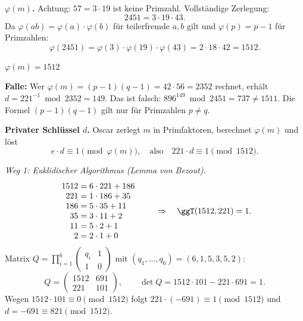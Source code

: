  \textbf{$\varphi(m)$.} Achtung: $57 = 3 \cdot 19$ ist keine Primzahl. Vollständige Zerlegung:
\[
2451 = 3 \cdot 19 \cdot 43 .
\]
Da $\varphi(ab) = \varphi(a) \cdot \varphi(b)$ für teilerfremde $a, b$ gilt und $\varphi(p) = p - 1$ für Primzahlen:
\[
\varphi(2451) = \varphi(3) \cdot \varphi(19) \cdot \varphi(43) = 2 \cdot 18 \cdot 42 = 1512 .
\]
\begin{ergebnis} $\varphi(m) = 1512$ \end{ergebnis}
\begin{achtung}
\textbf{Falle:} Wer $\varphi(m) = (p-1)(q-1) = 42 \cdot 56 = 2352$ rechnet, erhält $d = 221^{-1} \bmod 2352 = 149$.
Das ist falsch: $896^{149} \bmod 2451 = 737 \neq 1511$. Die Formel $(p-1)(q-1)$ gilt nur für Primzahlen $p \neq q$.
\end{achtung}

 \textbf{Privater Schlüssel $d$.}
Oscar zerlegt $m$ in Primfaktoren, berechnet $\varphi(m)$ und löst
\[
e \cdot d \equiv 1 \pmod{\varphi(m)}, \quad\text{also}\quad 221 \cdot d \equiv 1 \pmod{1512}.
\]

\emph{Weg 1: Euklidischer Algorithmus (Lemma von Bezout).}
\[
\begin{array}{r@{\;=\;}l}
1512 & 6 \cdot 221 + 186\\
221 & 1 \cdot 186 + 35\\
186 & 5 \cdot 35 + 11\\
35 & 3 \cdot 11 + 2\\
11 & 5 \cdot 2 + 1\\
2 & 2 \cdot 1 + 0
\end{array}
\qquad\Rightarrow\quad \ggT(1512, 221) = 1 .
\]
Matrix $Q = \prod_{i=1}^{6} \begin{pmatrix} q_i & 1\\ 1 & 0\end{pmatrix}$ mit $(q_1, \dots, q_6) = (6, 1, 5, 3, 5, 2)$:
\[
Q = \begin{pmatrix} 1512 & 691\\ 221 & 101 \end{pmatrix}, \qquad
\det Q = 1512 \cdot 101 - 221 \cdot 691 = 1 .
\]
Wegen $1512 \cdot 101 \equiv 0 \pmod{1512}$ folgt $221 \cdot (-691) \equiv 1 \pmod{1512}$ und $d = -691 \equiv 821 \pmod{1512}$.

